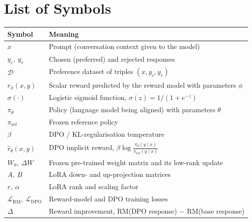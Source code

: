 \documentclass[a4paper,12pt,oneside]{report}
\newcommand{\pit}{\pi_\theta}
\newcommand{\piref}{\pi_{\mathrm{ref}}}
\begin{document}
\chapter*{List of Symbols}
\begin{longtable}{@{}p{3.2cm}p{11cm}@{}}
\toprule
\textbf{Symbol} & \textbf{Meaning}\\
\midrule\endhead
$x$ & Prompt (conversation context given to the model)\\
$y_c,\ y_r$ & Chosen (preferred) and rejected responses\\
$\mathcal{D}$ & Preference dataset of triples $(x, y_c, y_r)$\\
$r_\phi(x,y)$ & Scalar reward predicted by the reward model with parameters $\phi$\\
$\sigma(\cdot)$ & Logistic sigmoid function, $\sigma(z)=1/(1+e^{-z})$\\
$\pit$ & Policy (language model being aligned) with parameters $\theta$\\
$\piref$ & Frozen reference policy\\
$\beta$ & DPO / KL-regularisation temperature\\
$\hat r_\theta(x,y)$ & DPO implicit reward, $\beta\log\frac{\pit(y\mid x)}{\piref(y\mid x)}$\\
$W_0,\ \Delta W$ & Frozen pre-trained weight matrix and its low-rank update\\
$A,\ B$ & LoRA down- and up-projection matrices\\
$r,\ \alpha$ & LoRA rank and scaling factor\\
$\mathcal{L}_{\mathrm{RM}},\ \mathcal{L}_{\mathrm{DPO}}$ & Reward-model and DPO training losses\\
$\Delta$ & Reward improvement, RM(DPO response) $-$ RM(base response)\\
\bottomrule
\end{longtable}

\cleardoublepage
{}
\setcounter{page}{1}








\cleardoublepage
{}



\appendix

\end{document}
